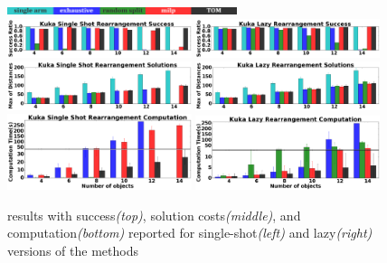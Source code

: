 \begin{figure}[t]
	\centering
	\includegraphics[width=0.6\textwidth]{figures/results/labels}
	\includegraphics[width=0.48\textwidth]{figures/results/2_kuka_ms_success}
	\includegraphics[width=0.48\textwidth]{figures/results/1_kuka_lazy_ms_success}
	\includegraphics[width=0.48\textwidth]{figures/results/2_kuka_ms_cost}
	\includegraphics[width=0.48\textwidth]{figures/results/1_kuka_lazy_ms_cost}
	\includegraphics[width=0.48\textwidth]{figures/results/2_kuka_ms_time}
	\includegraphics[width=0.48\textwidth]{figures/results/1_kuka_lazy_ms_time}
	\vspace{-0.1in}
    \caption{\textit{\kuka}results with success\textit{(top)}, solution costs\textit{(middle)}, and computation\textit{(bottom)} reported for single-shot\textit{(left)} and lazy\textit{(right)} versions of the methods}
    \vspace{-0.2in}
	\label{fig:kuka}
\end{figure}




